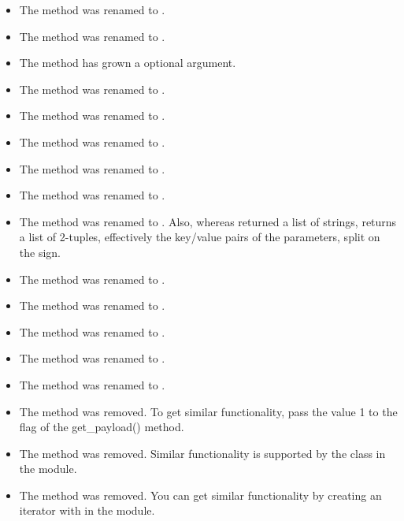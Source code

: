 \begin{itemize}
\item The method  was renamed to .
\item The method  was renamed to
      .
\item The  method has grown a 
      optional argument.
\item The method  was renamed to .
\item The method  was renamed to .
\item The method  was renamed to .
\item The method was renamed to
      .
\item The method  was renamed to
      .
\item The method  was renamed to
      .
      Also, whereas  returned a list of strings,
       returns a list of 2-tuples, effectively
      the key/value pairs of the parameters, split on the \character{=}
      sign.
\item The method  was renamed to .
\item The method  was renamed to
      .
\item The method  was renamed to
      .
\item The method  was renamed to
      .
\item The method  was renamed to
      .
\item The method  was removed.  To get
      similar functionality, pass the value 1 to the  flag
      of the {get_payload()} method.
\item The method  was removed.  Similar
      functionality
      is supported by the  class in the
       module.
\item The method  was removed.  You can get
      similar functionality by creating an iterator with
       in the
       module.
\end{itemize}

